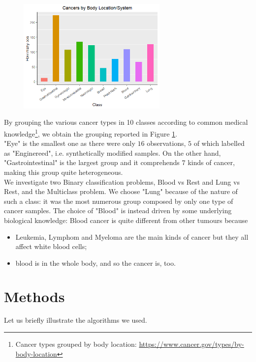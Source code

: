\documentclass[a4paper,11pt, oneside]{article}  %
\begin{document}
\begin{figure}
	\includegraphics[width=0.65\textwidth]{plot1.png}
	\label{fig1}
\end{figure}
By grouping the various cancer types in 10 classes according to common medical knowledge\footnote{Cancer types grouped by body location: \url{https://www.cancer.gov/types/by-body-location}},  we obtain the grouping reported in Figure \ref{fig1}. \\
"Eye" is the smallest one as there were only $16$ observations, $5$ of which labelled as "Enginereed", i.e.  synthetically modified samples. On the other hand, "Gastrointestinal" is the largest group and it comprehends $7$ kinds of cancer,  making this group quite heterogeneous. \\
We investigate two Binary classification problems,  Blood vs Rest and Lung vs Rest, and the Multiclass problem. We choose "Lung" because of the nature of such a class: it was the most numerous group composed by only one type of cancer samples. The choice of "Blood" is instead driven by some underlying biological knowledge: Blood cancer is quite different from other tumours because
\begin{itemize}
	\item Leukemia, Lymphom and Myeloma are the main kinds of cancer but they all affect white blood cells;
	\item blood is in the whole body, and so the cancer is, too.
\end{itemize} 

\section{Methods}
Let us briefly illustrate the algorithms we used. 
\end{document}

